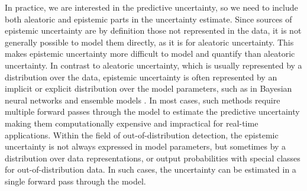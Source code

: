 In practice, we are interested in the predictive uncertainty, so we need to include both aleatoric and epistemic parts in the uncertainty estimate. 
Since sources of epistemic uncertainty are by definition those not represented in the data, it is not generally possible to model them directly, as it is for aleatoric uncertainty. This makes epistemic uncertainty more difficult to model and quantify than aleatoric uncertainty. 
In contrast to aleatoric uncertainty, which is usually represented by a distribution over the data, epistemic uncertainty is often represented by an implicit or explicit distribution over the model parameters, such as in Bayesian neural networks \cite{mackay_practical_1992, neal_bayesian_1995} and ensemble models \cite{gal_dropout_2016,lakshminarayanan_simple_2017}. In most cases, such methods require multiple forward passes through the model to estimate the predictive uncertainty making them computationally expensive and impractical for real-time applications. Within the field of out-of-distribution detection, the epistemic uncertainty is not always expressed in model parameters, but sometimes by a distribution over data representations, or output probabilities with special classes for out-of-distribution data. In such cases, the uncertainty can be estimated in a single forward pass through the model.


